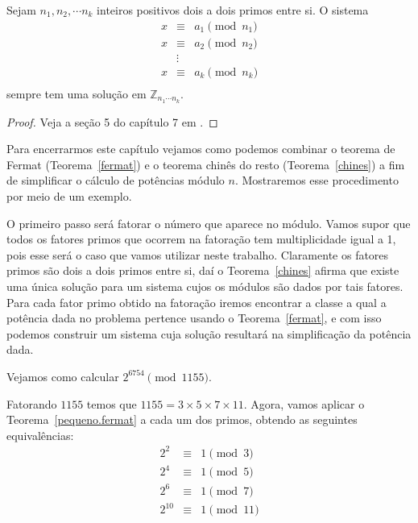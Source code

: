 \begin{Th}\label{chines}
Sejam $n_1, n_2, \cdots n_k$ inteiros positivos dois a dois primos entre si. O sistema
\[
\begin{array}{ccc}
 x & \equiv & a_1 \pmod{n_1}\\ 
 x & \equiv & a_2 \pmod{n_2} \\
   & \vdots &   \\
x & \equiv & a_k \pmod{n_k} \\	
\end{array}
\]
sempre tem uma solu\c{c}\~ao em $\mathbb{Z}_{n_1\cdots n_k}$.
\end{Th}
\begin{proof}
  Veja a se\c{c}\~{a}o 5 do cap\'{i}tulo 7 em \cite{cou:2014}.  
\end{proof}

Para encerrarmos este cap\'itulo vejamos como podemos combinar o teorema de Fermat (Teorema~\ref{fermat}) 
e o teorema chin\^es do resto (Teorema~\ref{chines}) a fim de simplificar o c\'{a}lculo de pot\^{e}ncias 
m\'{o}dulo $n$. Mostraremos esse procedimento por meio de um exemplo.


O primeiro passo ser\'{a} fatorar o n\'{u}mero que aparece no m\'{o}dulo. Vamos supor que 
todos os fatores primos que ocorrem na fatora\c{c}\~{a}o tem multiplicidade igual a 1, pois esse ser\'{a} o 
caso que vamos utilizar neste trabalho. Claramente os fatores primos s\~{a}o dois a dois primos entre si,
da\'{i} o Teorema~\ref{chines} afirma que existe uma \'{u}nica solu\c{c}\~{a}o para um sistema 
cujos os m\'{o}dulos s\~{a}o dados por tais fatores. Para cada fator primo obtido na fatora\c{c}\~{a}o iremos encontrar a 
classe a qual a pot\^{e}ncia dada no problema pertence usando o Teorema~\ref{fermat}, e com isso podemos construir um 
sistema cuja solu\c{c}\~{a}o resultar\'{a} na simplifica\c{c}\~{a}o da pot\^{e}ncia dada. 

Vejamos como calcular $2^{6754} \pmod{1155}$. 					

Fatorando $1155$ temos que $1155= 3 \times 5 \times 7 \times 11$. Agora, vamos aplicar o Teorema~\ref{pequeno.fermat} 
a cada um dos primos, obtendo as seguintes equival\^{e}ncias:
\[
\begin{array}{ccl}
 2^2    & \equiv & 1 \pmod{3}\\
 2^4    & \equiv & 1 \pmod{5}\\ 
 2^6    & \equiv & 1 \pmod{7}\\  
 2^{10} & \equiv & 1 \pmod{11}\\
\end{array}
\]

